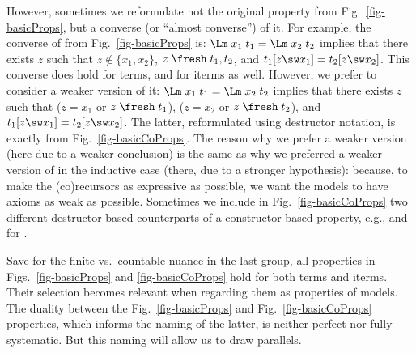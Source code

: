 However, %
sometimes we reformulate not the original property from Fig.~\ref{fig-basicProps}, but a converse (or ``almost converse'') of it. 
For example, the converse of 
\SwCg{} from Fig.~\ref{fig-basicProps} is:
%
$\Lm\;x_1\;t_1 = \Lm\;x_2\;t_2$ implies that there exists $z$ such that %
$z \not\in \{x_1,x_2\}$, 
$z\;\fresh\;t_1,t_2$, and 
$t_1[z\sw x_1] = t_2[z\sw x_2]$. 
%
This converse does hold for terms, and for iterms as well. However, we prefer to consider a weaker version of it: %
%
	$\Lm\;x_1\;t_1 = \Lm\;x_2\;t_2$ implies that there exists $z$ such that %
	($z = x_1$ or $z\;\fresh\;t_1$), ($z = x_2$ or $z\;\fresh\;t_2$), 
    and 
	$t_1[z\sw x_1] = t_2[z\sw x_2]$. 
The latter, reformulated using destructor notation, is   exactly \ISwCg{} from Fig.~\ref{fig-basicCoProps}.  
%
%
%
The reason why we prefer a weaker version (here due to a weaker conclusion) %
is the same as why 
we preferred a weaker version of \SwCg{} in the inductive case (there, due to a stronger hypothesis): because, to make the (co)recursors  
as expressive as possible, 
we want the models %
to have axioms as weak as possible. %
Sometimes we include in Fig.~\ref{fig-basicCoProps} two different destructor-based counterparts of a 
constructor-based property, e.g., \IRnBvr{} and \IIRnBvr{} for \RnBvr{}. 


Save for the %
finite vs.\ countable nuance in the  last group, all %
properties in Figs.~\ref{fig-basicProps} and \ref{fig-basicCoProps} %
hold 
for both terms and iterms. Their selection 
becomes %
relevant when 
regarding them as properties %
of %
models.  
%
The duality between the Fig.~\ref{fig-basicProps} and Fig.~\ref{fig-basicCoProps} properties, which informs the naming of the latter, is neither perfect nor fully systematic. But this naming %
will allow us to draw %
parallels. %




